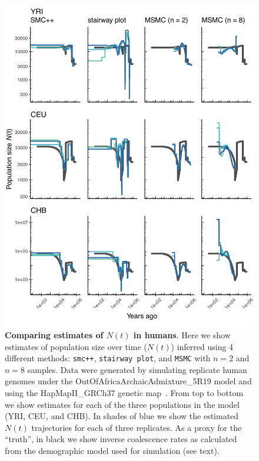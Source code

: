 \documentclass[12pt,halfline,a4paper]{ouparticle}
\newcommand{\MSMC}{\texttt{MSMC}\xspace}
\newcommand{\smcpp}{\texttt{smc++}\xspace}
\begin{document}
\begin{figure}
\begin{center}
\includegraphics[width=0.8\linewidth]{display_items/HomSap_OutOfAfricaArchaicAdmixture_5R19.pdf}
\caption{\textbf{Comparing estimates of $N(t)$ in humans}. Here we show estimates of population
size over time ($N(t)$) inferred using 4 different methods: \smcpp, \texttt{stairway plot}, and
\MSMC with $n=2$ and $n=8$ samples. Data were generated by simulating
replicate human genomes under the OutOfAfricaArchaicAdmixture\_5R19 model \citep{ragsdale2019models} and using the
HapMapII\_GRCh37 genetic map~\citep{international2007second}. From top to bottom we show estimates for each
of the three populations in the model (YRI, CEU, and CHB). In shades of blue we show the estimated
$N(t)$ trajectories for each of three replicates.
As a proxy for the ``truth'', in black we show inverse coalescence rates
as calculated from the demographic model used for simulation (see text).
}
\label{fig:n_t_ragsdale}
\end{center}
\end{figure}
\end{document}
